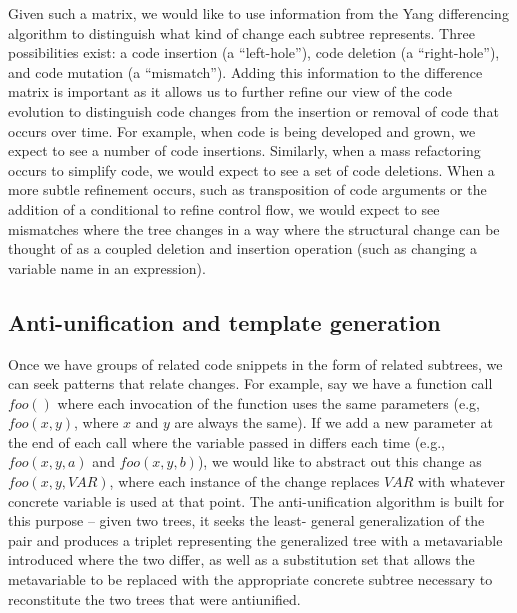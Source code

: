 Given such a matrix, we would like to use information from the Yang
differencing algorithm to distinguish what kind of change each subtree
represents.  Three possibilities exist: a code insertion (a ``left-hole''),
code deletion (a ``right-hole''), and code mutation (a ``mismatch'').  Adding
this information to the difference matrix is important as it allows us to
further refine our view of the code evolution to distinguish code changes from
the insertion or removal of code that occurs over time. For example, when code
is being developed and grown, we expect to see a number of code insertions.
Similarly, when a mass refactoring occurs to simplify code, we would expect to
see a set of code deletions.  When a more subtle refinement occurs, such as
transposition of  code arguments or the addition of a conditional to refine
control flow, we would expect to see mismatches where the tree changes in a
way where the structural change can be thought of as a  coupled deletion and
insertion operation (such as changing a variable name in an expression).

\subsection{Anti-unification and template generation}

Once we have groups of related code snippets in the form of related subtrees,
we can seek patterns that relate changes.  For example, say we have a function
call $foo()$ where each invocation of the function uses the same parameters
(e.g, $foo(x,y)$, where $x$ and $y$ are always the same). If we add a new
parameter at the end of each call where the variable passed in differs each
time (e.g., $foo(x,y,a)$ and $foo(x,y,b)$), we would like to abstract out this
change as $foo(x,y,VAR)$, where each instance of the change replaces $VAR$
with whatever concrete variable is used at that point.  The anti-unification
algorithm is built for this purpose -- given two trees, it seeks the least-
general generalization of the pair and produces a triplet representing the
generalized tree with a metavariable introduced where the two differ, as well
as a substitution set that allows the metavariable to be replaced with the
appropriate concrete subtree necessary to reconstitute the two trees that were
antiunified.
